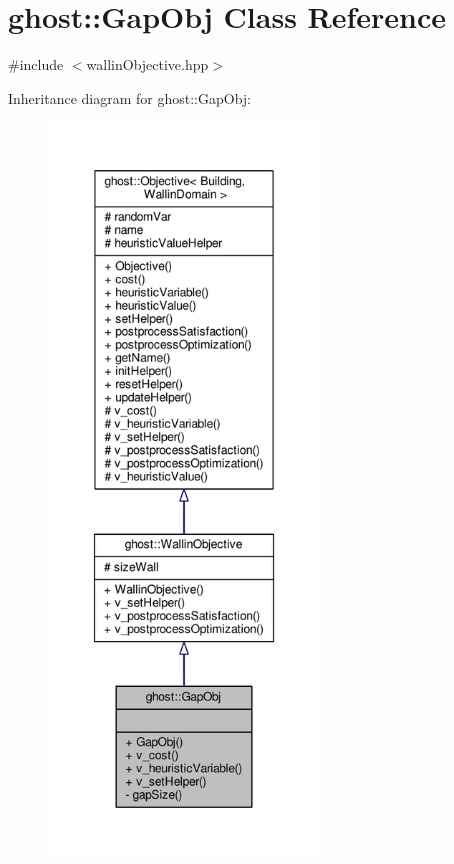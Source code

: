 \hypertarget{classghost_1_1GapObj}{\section{ghost\-:\-:Gap\-Obj Class Reference}
\label{classghost_1_1GapObj}
}


{\ttfamily \#include $<$wallin\-Objective.\-hpp$>$}



Inheritance diagram for ghost\-:\-:Gap\-Obj\-:\nopagebreak
\begin{figure}[H]
\begin{center}
\leavevmode
\includegraphics[height=550pt]{classghost_1_1GapObj__inherit__graph}
\end{center}
\end{figure}


